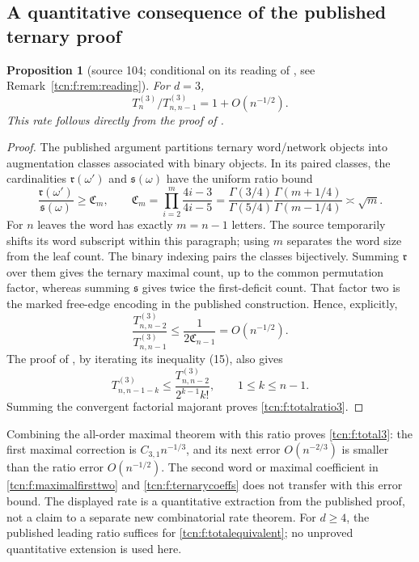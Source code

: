 \documentclass[11pt,letterpaper]{article}
\newtheorem{proposition}[theorem]{Proposition}
\theoremstyle{remark}
\begin{document}
\subsection{A quantitative consequence of the published ternary proof}\label{tcn:f:sec:ternarytotal}
\begin{proposition}[source 104; conditional on its reading of {\cite{Chang2024}}, see Remark~\ref{tcn:f:rem:reading}]\label{tcn:f:prop:total3rate}
For $d=3$,
\begin{equation}\label{tcn:f:totalratio3}
 T^{(3)}_n/T^{(3)}_{n,n-1}=1+O(n^{-1/2}).
\end{equation}
This rate follows directly from the proof of \cite[Lemma 3.24 and Theorem 1.9(ii)]{Chang2024}.
\end{proposition}
\begin{proof}
The published argument partitions ternary word/network objects into augmentation classes associated with binary objects. In its paired classes, the cardinalities $\mathfrak r(\omega')$ and $\mathfrak s(\omega)$ have the uniform ratio bound
\[
 \frac{\mathfrak r(\omega')}{\mathfrak s(\omega)}\ge \mathfrak C_m,
 \qquad \mathfrak C_m=\prod_{i=2}^m\frac{4i-3}{4i-5}
 =\frac{\Gamma(3/4)}{\Gamma(5/4)}
   \frac{\Gamma(m+1/4)}{\Gamma(m-1/4)}\asymp\sqrt m.
\]
For $n$ leaves the word has exactly $m=n-1$ letters. The source temporarily shifts its word subscript within this paragraph; using $m$ separates the word size from the leaf count. The binary indexing pairs the classes bijectively. Summing $\mathfrak r$ over them gives the ternary maximal count, up to the common permutation factor, whereas summing $\mathfrak s$ gives twice the first-deficit count. That factor two is the marked free-edge encoding in the published construction. Hence, explicitly,
\[
 \frac{T^{(3)}_{n,n-2}}{T^{(3)}_{n,n-1}}
 \le\frac1{2\mathfrak C_{n-1}}=O(n^{-1/2}).
\]
The proof of \cite[Theorem 1.9(ii)]{Chang2024}, by iterating its inequality (15), also gives
\[
 T^{(3)}_{n,n-1-k}\le\frac{T^{(3)}_{n,n-2}}{2^{k-1}k!},
 \qquad 1\le k\le n-1.
\]
Summing the convergent factorial majorant proves \eqref{tcn:f:totalratio3}.
\end{proof}
Combining the all-order maximal theorem with this ratio proves \eqref{tcn:f:total3}: the first maximal correction is $C_{3,1}n^{-1/3}$, and its next error $O(n^{-2/3})$ is smaller than the ratio error $O(n^{-1/2})$. The second word or maximal coefficient in \eqref{tcn:f:maximalfirsttwo} and \eqref{tcn:f:ternarycoeffs} does not transfer with this error bound. The displayed rate is a quantitative extraction from the published proof, not a claim to a separate new combinatorial rate theorem. For $d\ge4$, the published leading ratio suffices for \eqref{tcn:f:totalequivalent}; no unproved quantitative extension is used here.
\end{document}
